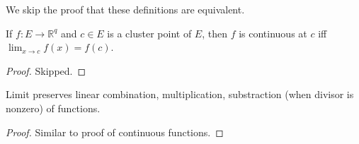 We skip the proof that these definitions are equivalent.

\begin{proposition}
	If $f: E \to \mathbb{R}^q$ and $c \in E$ is a cluster point of $E$, then $f$ is continuous at $c$ iff $\lim_{x \to c} f(x) = f(c)$.
\end{proposition}
\begin{proof}
	Skipped.
\end{proof}

\begin{proposition}
	Limit preserves linear combination, multiplication, substraction (when divisor is nonzero) of functions.
\end{proposition}
\begin{proof}
	Similar to proof of continuous functions.
\end{proof}



